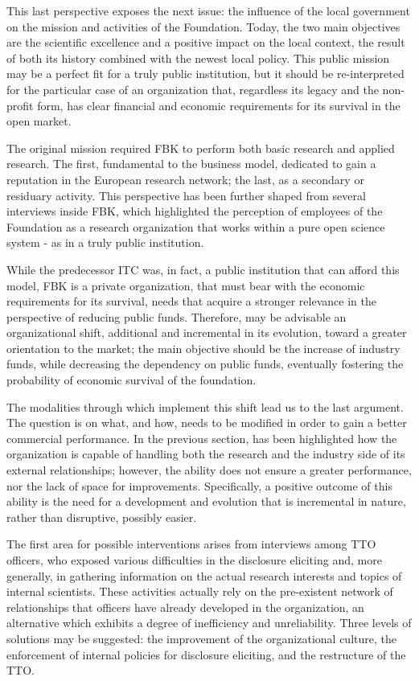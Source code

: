 This last perspective exposes the next issue: the influence of the local government on the mission and activities of the Foundation. Today, the two main objectives are the scientific excellence and a positive impact on the local context, the result of both its history combined with the newest local policy. This public mission may be a perfect fit for a truly public institution, but it should be re-interpreted for the particular case of an organization that, regardless its legacy and the non-profit form, has clear financial and economic requirements for its survival in the open market. 

The original mission required FBK to perform both basic research and applied research. The first, fundamental to the business model, dedicated to gain a reputation in the European research network; the last, as a secondary or residuary activity. This perspective has been further shaped from several interviews inside FBK, which highlighted the perception of employees of the Foundation as a research organization that works within a pure open science system - as in a truly public institution. 

While the predecessor ITC was, in fact, a public institution that can afford this model, FBK is a private organization, that must bear with the economic requirements for its survival, needs that acquire a stronger relevance in the perspective of reducing public funds. Therefore, may be advisable an organizational shift, additional and incremental in its evolution, toward a greater orientation to the market; the main objective should be the increase of industry funds, while decreasing the dependency on public funds, eventually fostering the probability of economic survival of the foundation.

The modalities through which implement this shift lead us to the last argument. The question is on what, and how, needs to be modified in order to gain a better commercial performance. In the previous section, has been highlighted how the organization is capable of handling both the research and the industry side of its external relationships; however, the ability does not ensure a greater performance, nor the lack of space for improvements. Specifically, a positive outcome of this ability is the need for a development and evolution that is incremental in nature, rather than disruptive, possibly easier.

The first area for possible interventions arises from interviews among TTO officers, who exposed various difficulties in the disclosure eliciting and, more generally, in gathering information on the actual research interests and topics of internal scientists. These activities actually rely on the pre-existent network of relationships that officers have already developed in the organization, an alternative which exhibits a degree of inefficiency and unreliability. Three levels of solutions may be suggested: the improvement of the organizational culture, the enforcement of internal policies for disclosure eliciting, and the restructure of the TTO.

